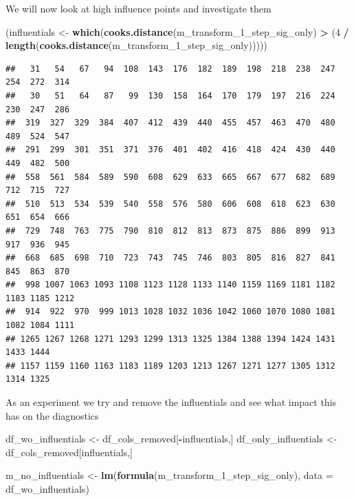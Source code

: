 \documentclass[
]{article}
\newenvironment{Shaded}{\begin{snugshade}}{\end{snugshade}}
\newcommand{\DataTypeTok}[1]{\textcolor[rgb]{0.13,0.29,0.53}{#1}}
\newcommand{\DecValTok}[1]{\textcolor[rgb]{0.00,0.00,0.81}{#1}}
\newcommand{\KeywordTok}[1]{\textcolor[rgb]{0.13,0.29,0.53}{\textbf{#1}}}
\newcommand{\NormalTok}[1]{#1}
\newcommand{\OperatorTok}[1]{\textcolor[rgb]{0.81,0.36,0.00}{\textbf{#1}}}
\newcommand{\StringTok}[1]{\textcolor[rgb]{0.31,0.60,0.02}{#1}}
\begin{document}
We will now look at high influence points and investigate them

\begin{Shaded}
\begin{Highlighting}[]
\NormalTok{(influentials <-}\StringTok{ }\KeywordTok{which}\NormalTok{(}\KeywordTok{cooks.distance}\NormalTok{(m_transform_}\DecValTok{1}\NormalTok{_step_sig_only) }\OperatorTok{>}\StringTok{ }\NormalTok{(}\DecValTok{4} \OperatorTok{/}\StringTok{ }\KeywordTok{length}\NormalTok{(}\KeywordTok{cooks.distance}\NormalTok{(m_transform_}\DecValTok{1}\NormalTok{_step_sig_only)))))}
\end{Highlighting}
\end{Shaded}

\begin{verbatim}
##   31   54   67   94  108  143  176  182  189  198  218  238  247  254  272  314 
##   30   51   64   87   99  130  158  164  170  179  197  216  224  230  247  286 
##  319  327  329  384  407  412  439  440  455  457  463  470  480  489  524  547 
##  291  299  301  351  371  376  401  402  416  418  424  430  440  449  482  500 
##  558  561  584  589  590  608  629  633  665  667  677  682  689  712  715  727 
##  510  513  534  539  540  558  576  580  606  608  618  623  630  651  654  666 
##  729  748  763  775  790  810  812  813  873  875  886  899  913  917  936  945 
##  668  685  698  710  723  743  745  746  803  805  816  827  841  845  863  870 
##  998 1007 1063 1093 1108 1123 1128 1133 1140 1159 1169 1181 1182 1183 1185 1212 
##  914  922  970  999 1013 1028 1032 1036 1042 1060 1070 1080 1081 1082 1084 1111 
## 1265 1267 1268 1271 1293 1299 1313 1325 1384 1388 1394 1424 1431 1433 1444 
## 1157 1159 1160 1163 1183 1189 1203 1213 1267 1271 1277 1305 1312 1314 1325
\end{verbatim}

As an experiment we try and remove the influentials and see what impact this has on the diagnostics

\begin{Shaded}
\begin{Highlighting}[]
\NormalTok{df_wo_influentials <-}\StringTok{ }\NormalTok{df_cols_removed[}\OperatorTok{-}\NormalTok{influentials,]}
\NormalTok{df_only_influentials <-}\StringTok{ }\NormalTok{df_cols_removed[influentials,]}

\NormalTok{m_no_influentials <-}\StringTok{ }\KeywordTok{lm}\NormalTok{(}\KeywordTok{formula}\NormalTok{(m_transform_}\DecValTok{1}\NormalTok{_step_sig_only), }\DataTypeTok{data =}\NormalTok{ df_wo_influentials)}
\end{Highlighting}
\end{Shaded}
\end{document}
